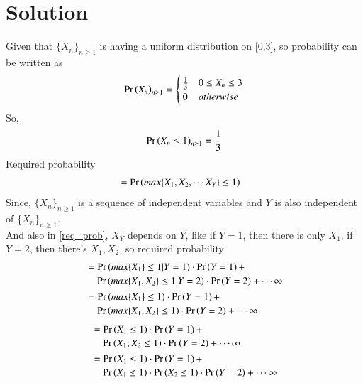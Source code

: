 \documentclass[journal,12pt,twocolumn]{IEEEtran}
\begin{document}
\section{Solution}
Given that $\{X_n\}_{n\ge 1}$ is having a uniform distribution on [0,3], so probability can be written as
\begin{align}
\Pr\left(X_n\right)_{n\ge 1}=  
\begin{cases}
\frac{1}{3} & 0\le X_n\le 3 \\
0 & otherwise
\end{cases}
\end{align}
So,
\begin{align}
    \Pr\left(X_n\le 1\right)_{n\ge 1}=\frac{1}{3}
\end{align}
Required probability
\begin{align}
 &=\Pr\left(max\{X_1,X_2,\cdots X_Y\}\le 1\right)\label{req_prob}
 \end{align}
 Since, $\{X_n\}_{n\ge 1}$ is a sequence of independent variables and $Y$ is also independent of $\{X_n\}_{n\ge 1}$.\\
 And also in \eqref{req_prob}, $X_Y$ depends on $Y$, like if $Y=1$, then there is only $X_1$, if $Y=2$, then there's $X_1,X_2$, so required probability
 \begin{align}
 & \begin{multlined}
    =\pr{max\{X_1\}\le 1|Y=1}\cdot \pr{Y=1}+\\
    \pr{max\{X_1,X_2\}\le 1|Y=2}\cdot \pr{Y=2}+\cdots \infty 
\end{multlined}\\
& \begin{multlined}
    =\pr{max\{X_1\}\le 1}\cdot \pr{Y=1}+\\
    \pr{max\{X_1,X_2\}\le 1}\cdot \pr{Y=2}+\cdots \infty 
\end{multlined}\\
\end{align}
\begin{align}
&\begin{multlined}
    =\pr{X_1\le 1}\cdot \pr{Y=1}+\\
    \pr{X_1,X_2\le 1}\cdot\pr{Y=2}+\cdots \infty
\end{multlined}\\
&\begin{multlined}
    =\pr{X_1\le 1}\cdot \pr{Y=1}+\\
    \pr{X_1\le 1}\cdot\pr{X_2\le 1}\cdot\pr{Y=2}+\cdots \infty
\end{multlined}
\end{align}
\end{document}
